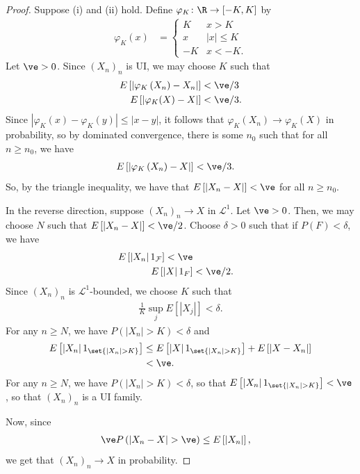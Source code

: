 \documentclass[10pt]{mypackage}
\begin{document}
\begin{proof}
  Suppose (i) and (ii) hold. Define $\varphi_K\colon \R\to [-K,K]$ by
  \begin{align*}
    \varphi_K(x) &= \begin{cases}
      K & x > K\\
      x & \left\vert x \right\vert \leq K\\
      -K & x < -K.
    \end{cases}
  \end{align*}
  Let $\ve > 0$. Since $\left( X_n \right)_{n}$ is UI, we may choose $K$ such that
  \begin{align*}
    E\left[ \left\vert \varphi_K\left( X_n \right) - X_n \right\vert \right] &< \ve/3\\
    E\left[ \left\vert \varphi_K(X)-X \right\vert \right] &< \ve/3.
  \end{align*}
  Since $\left\vert \varphi_K(x)-\varphi_K(y) \right\vert \leq \left\vert x-y \right\vert$, it follows that $\varphi_K\left( X_n \right)\to \varphi_K\left( X \right)$ in probability, so by dominated convergence, there is some $n_0$ such that for all $n\geq n_0$, we have
  \begin{align*}
    E\left[ \left\vert \varphi_K\left( X_n \right) - X \right\vert \right] & < \ve/3.
  \end{align*}
  So, by the triangle inequality, we have that $E\left[ \left\vert X_n-X \right\vert \right] < \ve$ for all $n\geq n_0$.

  In the reverse direction, suppose $\left( X_n \right)_n\to X$ in $\mathcal{L}^1$. Let $\ve > 0$. Then, we may choose $N$ such that $E\left[ \left\vert X_n-X \right\vert \right] < \ve/2$. Choose $\delta > 0$ such that if $P(F) < \delta$, we have
  \begin{align*}
    E\left[ \left\vert X_n \right\vert1_{\mathcal{F}} \right] < \ve\\
    E\left[ \left\vert X \right\vert1_{F} \right] &< \ve/2.
  \end{align*}
  Since $\left( X_n \right)_n$ is $\mathcal{L}^1$-bounded, we choose $K$ such that
  \begin{align*}
    \frac{1}{K}\sup_{j}E\left[ \left\vert X_j \right\vert \right] < \delta.
  \end{align*}
  For any $n\geq N$, we have $P\left( \left\vert X_n \right\vert > K \right) < \delta$ and
  \begin{align*}
    E\left[ \left\vert X_n \right\vert1_{\set{\left\vert X_n \right\vert > K}} \right] &\leq E\left[ \left\vert X \right\vert1_{\set{\left\vert X_n \right\vert > K}} \right] + E\left[ \left\vert X-X_n \right\vert \right]\\
                                                                                       &< \ve.
  \end{align*}
  For any $n\geq N$, we have $P\left( \left\vert X_n \right\vert > K \right) < \delta$, so that $E\left[ \left\vert X_n \right\vert1_{\set{\left\vert X_n \right\vert > K}} \right] < \ve$, so that $\left( X_n \right)_{n}$ is a UI family.

  Now, since
  \begin{align*}
    \ve P\left( \left\vert X_n-X \right\vert > \ve \right) &\leq E\left[ \left\vert X_n \right\vert \right],
  \end{align*}
  we get that $\left( X_n \right)_n\to X$ in probability.
\end{proof}
\end{document}
